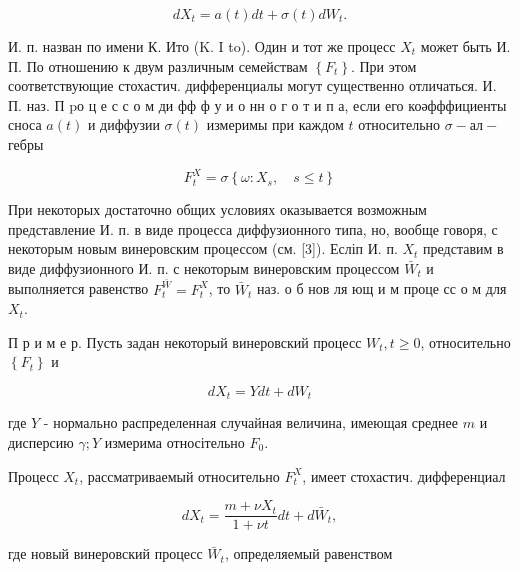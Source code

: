 \documentclass[10pt]{article}
\begin{document}
\[

d X_{t}=a(t) d t+\sigma(t) d W_{t} .

\]



И. п. назван по имени К. Ито (K. I to). Один и тот же процесс $X_{t}$ может быть И. П. По отношению к двум различным семействам $\left\{F_{t}\right\}$. При этом соответствующие стохастич. дифференциалы могут существенно отличаться. И. П. наз. П $\mathrm{p} о$ ц е с с о м ди фф ф у и о нн о г о т и п а, если его коәфффициенты сноса $a(t)$ и диффузии $\sigma(t)$ измеримы при каждом $t$ относительно $\sigma-а л-$ гебры



\[

F_{t}^{X}=\sigma\left\{\omega: X_{s}, \quad s \leqslant t\right\}

\]



При некоторых достаточно общих условиях оказывается возможным представление И. п. в виде процесса диффузионного типа, но, вообще говоря, с некоторым новым винеровским процессом (см. [3]). Есліп И. п. $X_{t}$ представим в виде диффузионного И. п. с некоторым винеровским процессом $\bar{W}_{t}$ и выполняется равенство $F_{t}^{\bar{W}}=F_{t}^{X}$, то $\bar{W}_{t}$ наз. о б нов ля ющ и м проце сс о м для $X_{t}$.



П р и м е р. Пусть задан некоторый винеровский процесс $W_{t}, t \geqslant 0$, относительно $\left\{F_{t}\right\}$ и



\[

d X_{t}=Y d t+d W_{t}

\]



где $Y$ - нормально распределенная случайная величина, имеющая среднее $m$ и дисперсию $\gamma ; Y$ измерима относітельно $F_{0}$.



Процесс $X_{t}$, рассматриваемый относительно $F_{t}^{X}$, имеет стохастич. дифференциал



\[

d X_{t}=\frac{m+\nu X_{t}}{1+\nu t} d t+d \bar{W}_{t},

\]



где новый винеровский процесс $\bar{W}_{t}$, определяемый равенством
\end{document}
